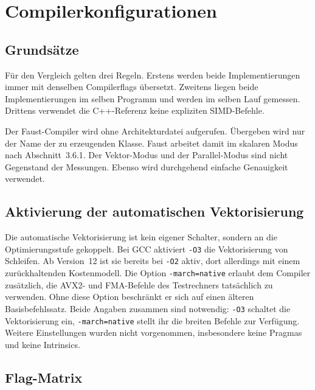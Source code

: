 \section{Compilerkonfigurationen}
\label{sec:compilerkonfig}

\subsection{Grundsätze}

Für den Vergleich gelten drei Regeln. Erstens werden beide Implementierungen
immer mit denselben Compilerflags übersetzt. Zweitens liegen beide
Implementierungen im selben Programm und werden im selben Lauf gemessen.
Drittens verwendet die C++-Referenz keine expliziten SIMD-Befehle.

Der Faust-Compiler wird ohne Architekturdatei aufgerufen. Übergeben wird nur
der Name der zu erzeugenden Klasse. Faust arbeitet damit im skalaren Modus
nach Abschnitt~3.6.1. Der Vektor-Modus und der Parallel-Modus sind nicht
Gegenstand der Messungen. Ebenso wird durchgehend einfache Genauigkeit
verwendet.

\subsection{Aktivierung der automatischen Vektorisierung}

Die automatische Vektorisierung ist kein eigener Schalter, sondern an die
Optimierungsstufe gekoppelt. Bei GCC aktiviert \texttt{-O3} die
Vektorisierung von Schleifen. Ab Version~12 ist sie bereits bei \texttt{-O2}
aktiv, dort allerdings mit einem zurückhaltenden Kostenmodell. Die Option
\texttt{-march=native} erlaubt dem Compiler zusätzlich, die AVX2- und
FMA-Befehle des Testrechners tatsächlich zu verwenden. Ohne diese Option
beschränkt er sich auf einen älteren Basisbefehlssatz. Beide Angaben
zusammen sind notwendig: \texttt{-O3} schaltet die Vektorisierung ein,
\texttt{-march=native} stellt ihr die breiten Befehle zur Verfügung. Weitere
Einstellungen wurden nicht vorgenommen, insbesondere keine Pragmas und keine
Intrinsics.

\subsection{Flag-Matrix}


